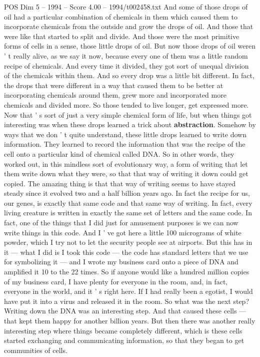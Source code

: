 \begin{textsample}{POS Dim 5 – 1994 – Score 4.00 – 1994/t002458.txt}
And some of those drops of oil had a particular combination of chemicals in them which caused them to incorporate chemicals from the outside and grow the drops of oil.
And those that were like that started to split and divide.
And those were the most primitive forms of cells in a sense, those little drops of oil.
But now those drops of oil weren ' t really alive, as we say it now, because every one of them was a little random recipe of chemicals.
And every time it divided, they got sort of unequal division of the chemicals within them.
And so every drop was a little bit different.
In fact, the drops that were different in a way that caused them to be better at incorporating chemicals around them, grew more and incorporated more chemicals and divided more.
So those tended to live longer, get expressed more.
Now that ' s sort of just a very simple chemical form of life, but when things got interesting was when these drops learned a trick about \textbf{abstraction}.
Somehow by ways that we don ' t quite understand, these little drops learned to write down information.
They learned to record the information that was the recipe of the cell onto a particular kind of chemical called DNA.
So in other words, they worked out, in this mindless sort of evolutionary way, a form of writing that let them write down what they were, so that that way of writing it down could get copied.
The amazing thing is that that way of writing seems to have stayed steady since it evolved two and a half billion years ago.
In fact the recipe for us, our genes, is exactly that same code and that same way of writing.
In fact, every living creature is written in exactly the same set of letters and the same code.
In fact, one of the things that I did just for amusement purposes is we can now write things in this code.
And I ' ve got here a little 100 micrograms of white powder, which I try not to let the security people see at airports.
But this has in it — what I did is I took this code — the code has standard letters that we use for symbolizing it — and I wrote my business card onto a piece of DNA and amplified it 10 to the 22 times.
So if anyone would like a hundred million copies of my business card, I have plenty for everyone in the room, and, in fact, everyone in the world, and it ' s right here.
If I had really been a egotist, I would have put it into a virus and released it in the room.
So what was the next step?
Writing down the DNA was an interesting step.
And that caused these cells — that kept them happy for another billion years.
But then there was another really interesting step where things became completely different, which is these cells started exchanging and communicating information, so that they began to get communities of cells.

\end{textsample}

